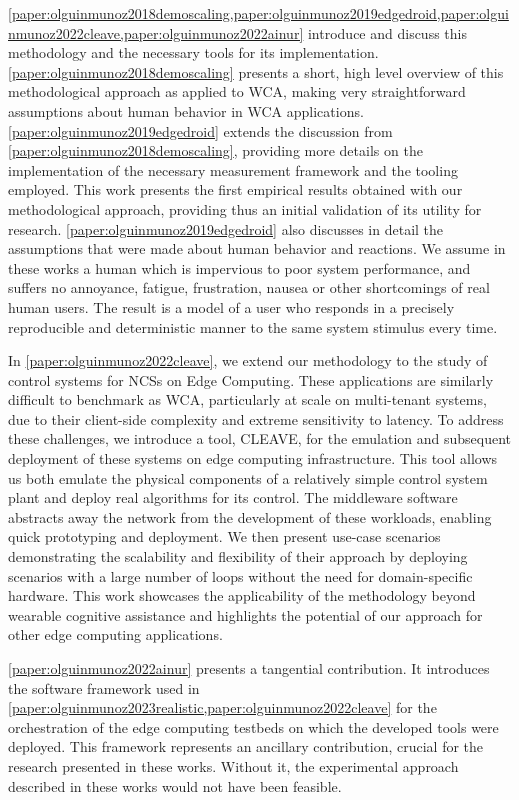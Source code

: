 \cref{paper:olguinmunoz2018demoscaling,paper:olguinmunoz2019edgedroid,paper:olguinmunoz2022cleave,paper:olguinmunoz2022ainur} introduce and discuss this methodology and the necessary tools for its implementation.
\cref{paper:olguinmunoz2018demoscaling} presents a short, high level overview of this methodological approach as applied to \gls{WCA}, making very straightforward assumptions about human behavior in \gls{WCA} applications.
\cref{paper:olguinmunoz2019edgedroid} extends the discussion from \cref{paper:olguinmunoz2018demoscaling}, providing more details on the implementation of the necessary measurement framework and the tooling employed.
This work presents the first empirical results obtained with our methodological approach, providing thus an initial validation of its utility for research.
\cref{paper:olguinmunoz2019edgedroid} also discusses in detail the assumptions that were made about human behavior and reactions.
We assume in these works a human which is impervious to poor system performance, and suffers no annoyance, fatigue, frustration, nausea or other shortcomings of real human users.
The result is a model of a user who responds in a precisely reproducible and deterministic manner to the same system stimulus every time.

In \cref{paper:olguinmunoz2022cleave}, we extend our methodology to the study of control systems for \glspl{NCS} on Edge Computing.
These applications are similarly difficult to benchmark as \gls{WCA}, particularly at scale on multi-tenant systems, due to their client-side complexity and extreme sensitivity to latency.
To address these challenges, we introduce a tool, \acs{CLEAVE}, for the emulation and subsequent deployment of these systems on edge computing infrastructure.
This tool allows us both emulate the physical components of a relatively simple control system plant and deploy real algorithms for its control.
The middleware software abstracts away the network from the development of these workloads, enabling quick prototyping and deployment.
We then present use-case scenarios demonstrating the scalability and flexibility of their approach by deploying scenarios with a large number of loops without the need for domain-specific hardware.
This work showcases the applicability of the methodology beyond wearable cognitive assistance and highlights the potential of our approach for other edge computing applications.

\cref{paper:olguinmunoz2022ainur} presents a tangential contribution.
It introduces the software framework used in \cref{paper:olguinmunoz2023realistic,paper:olguinmunoz2022cleave} for the orchestration of the edge computing testbeds on which the developed tools were deployed.
This framework represents an ancillary contribution, crucial for the research presented in these works.
Without it, the experimental approach described in these works would not have been feasible.

